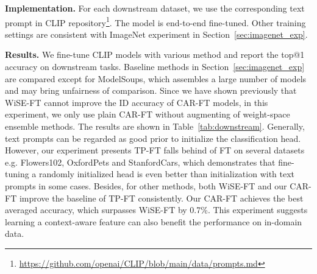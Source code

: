 \documentclass[pdflatex,sn-basic,iicol]{sn-jnl}
\theoremstyle{thmstyleone}\newtheorem{theorem}{Theorem}\newtheorem{proposition}[theorem]{Proposition}
\theoremstyle{thmstyletwo}\newtheorem{example}{Example}\newtheorem{remark}{Remark}
\theoremstyle{thmstylethree}\newtheorem{definition}{Definition}
\begin{document}
\noindent\textbf{Implementation.} For each downstream dataset, we use the corresponding text prompt in CLIP repository\footnote{\url{https://github.com/openai/CLIP/blob/main/data/prompts.md}}. The model is end-to-end fine-tuned. Other training settings are consistent with ImageNet experiment in Section~\ref{sec:imagenet_exp}. 

\noindent\textbf{Results.} We fine-tune CLIP models with various method and report the top@1 accuracy on downstream tasks. Baseline methods in Section~\ref{sec:imagenet_exp} are compared except for ModelSoups, which assembles a large number of models and may bring unfairness of comparison. Since we have shown previously that WiSE-FT cannot improve the ID accuracy of CAR-FT models, in this experiment, we only use plain CAR-FT without augmenting of weight-space ensemble methods. The results are shown in Table~\ref{tab:downstream}. Generally, text prompts can be regarded as good prior to initialize the classification head. However, our experiment presents TP-FT falls behind of FT on several datasets e.g. Flowers102, OxfordPets and StanfordCars, which demonstrates that fine-tuning a randomly initialized head is even better than initialization with text prompts in some cases. Besides, for other methods, both WiSE-FT and our CAR-FT improve the baseline of TP-FT consistently. Our CAR-FT achieves the best averaged accuracy, which surpasses WiSE-FT by 0.7\%. This experiment suggests learning a context-aware feature can also benefit the performance on in-domain data. 
\end{document}
